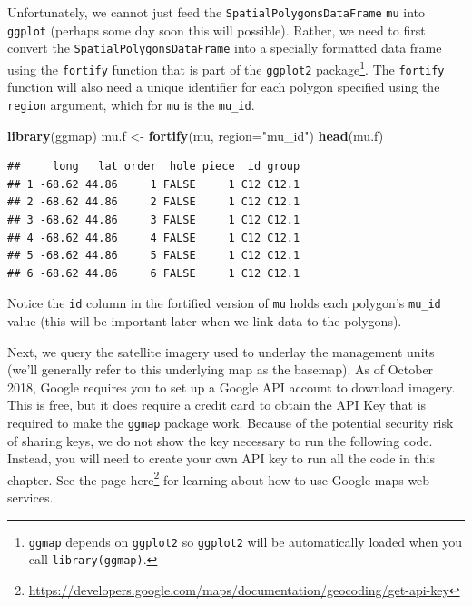 \documentclass[
]{krantz}
\newenvironment{Shaded}{\begin{snugshade}}{\end{snugshade}}
\newcommand{\DataTypeTok}[1]{\textcolor[rgb]{0.13,0.29,0.53}{#1}}
\newcommand{\KeywordTok}[1]{\textcolor[rgb]{0.13,0.29,0.53}{\textbf{#1}}}
\newcommand{\NormalTok}[1]{#1}
\newcommand{\StringTok}[1]{\textcolor[rgb]{0.31,0.60,0.02}{#1}}
\renewcommand{\href}[2]{#2\footnote{\url{#1}}}
\begin{document}
Unfortunately, we cannot just feed the \texttt{SpatialPolygonsDataFrame} \texttt{mu} into \texttt{ggplot} (perhaps some day soon this will possible). Rather, we need to first convert the \texttt{SpatialPolygonsDataFrame} into a specially formatted data frame using the \texttt{fortify} function that is part of the \texttt{ggplot2} package\footnote{\texttt{ggmap} depends on \texttt{ggplot2} so \texttt{ggplot2} will be automatically loaded when you call \texttt{library(ggmap)}.}. The \texttt{fortify} function will also need a unique identifier for each polygon specified using the \texttt{region} argument, which for \texttt{mu} is the \texttt{mu\_id}.

\begin{Shaded}
\begin{Highlighting}[]
\KeywordTok{library}\NormalTok{(ggmap)}
\NormalTok{mu.f \textless{}{-}}\StringTok{ }\KeywordTok{fortify}\NormalTok{(mu, }\DataTypeTok{region=}\StringTok{"mu\_id"}\NormalTok{)}
\KeywordTok{head}\NormalTok{(mu.f)}
\end{Highlighting}
\end{Shaded}

\begin{verbatim}
##     long   lat order  hole piece  id group
## 1 -68.62 44.86     1 FALSE     1 C12 C12.1
## 2 -68.62 44.86     2 FALSE     1 C12 C12.1
## 3 -68.62 44.86     3 FALSE     1 C12 C12.1
## 4 -68.62 44.86     4 FALSE     1 C12 C12.1
## 5 -68.62 44.86     5 FALSE     1 C12 C12.1
## 6 -68.62 44.86     6 FALSE     1 C12 C12.1
\end{verbatim}

Notice the \texttt{id} column in the fortified version of \texttt{mu} holds each polygon's \texttt{mu\_id} value (this will be important later when we link data to the polygons).

Next, we query the satellite imagery used to underlay the management units (we'll generally refer to this underlying map as the basemap). As of October 2018, Google requires you to set up a Google API account to download imagery. This is free, but it does require a credit card to obtain the API Key that is required to make the \texttt{ggmap} package work. Because of the potential security risk of sharing keys, we do not show the key necessary to run the following code. Instead, you will need to create your own API key to run all the code in this chapter. See the page \href{https://developers.google.com/maps/documentation/geocoding/get-api-key}{here} for learning about how to use Google maps web services.
\end{document}
